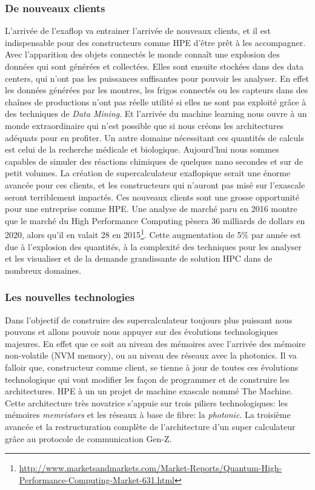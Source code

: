 \subsubsection{De nouveaux clients}
L'arrivée de l'exaflop va entrainer l'arrivée de nouveaux clients, et il est indispensable pour des constructeurs comme HPE d'être prêt à les accompagner. Avec l'apparition des objets connectés le monde connaît une explosion des données qui sont générées et collectées. Elles sont ensuite stockées dans des data centers, qui n'ont pas les puissances suffisantes pour pouvoir les analyser. En effet les données générées par les montres, les frigos connectés ou les capteurs dans des chaînes de productions n'ont pas réelle utilité si elles ne sont pas exploité grâce à des techniques de \textit{Data Mining}. Et l'arrivée du machine learning nous ouvre à un monde extraordinaire qui n'est possible que si nous créons les architectures adéquats pour en profiter. Un autre domaine nécessitant ces quantités de calculs est celui de la recherche médicale et biologique. Aujourd'hui nous sommes capables de simuler des réactions chimiques de quelques nano secondes et sur de petit volumes. La création de supercalculateur exaflopique serait une énorme avancée pour ces clients, et les constructeurs qui n'auront pas misé sur l'exascale seront terriblement impactés. Ces nouveaux clients sont une grosse opportunité pour une entreprise comme HPE. Une analyse de marché paru en 2016 montre que le marché du High Performance Computing pèsera 36 milliards de dollars en 2020, alors qu'il en valait 28 en 2015\footnote{\url{http://www.marketsandmarkets.com/Market-Reports/Quantum-High-Performance-Computing-Market-631.html}}. Cette augmentation de 5\% par année est due à l'explosion des quantités, à la complexité des techniques pour les analyser et les visualiser et de la demande grandissante de solution HPC dans de nombreux domaines.


\subsubsection{Les nouvelles technologies}
Dans l'objectif de construire des supercalculateur toujours plus puissant nous pouvons et allons pouvoir nous appuyer sur des évolutions technologiques majeures. En effet que ce soit au niveau des mémoires avec l'arrivée des mémoire non-volatile (NVM memory), ou au niveau des réseaux avec la photonics. Il va falloir que, constructeur comme client, se tienne à jour de toutes ces évolutions technologique qui vont modifier les façon de programmer et de construire les architectures. HPE à un un projet de machine exascale nommé The Machine. Cette architecture très novatrice s'appuie sur trois piliers technologiques: les mémoires \textit{memristors} et les réseaux à base de fibre: la \textit{ photonic}. La troisième avancée et la restructuration complète de l'architecture d'un super calculateur grâce au protocole de communication Gen-Z.\\

